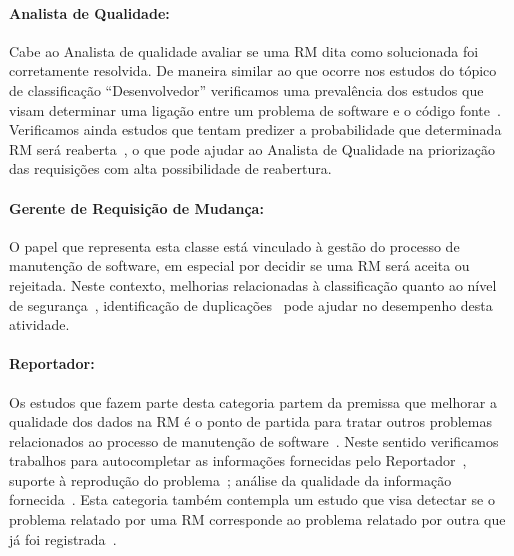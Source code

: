\paragraph{Analista de Qualidade:} Cabe ao Analista de qualidade avaliar se uma
RM dita como solucionada foi corretamente resolvida. De maneira similar ao que
ocorre nos estudos do tópico de classificação ``Desenvolvedor'' verificamos uma
prevalência dos estudos que visam determinar uma ligação entre um problema de
software e o código
fonte~\cite{corley2011recovering,Wong:2014:BBF:2705615.2706096,
	Thung:2014:BIT:2635868.2661678,Nguyen:2012:MAR:2393596.2393671,thung2013automatic,
	Romo:2015:TAT:2745802.2745833}. Verificamos ainda estudos que tentam
predizer a probabilidade que determinada RM será
reaberta~\cite{xia2015automatic}, o que pode ajudar ao Analista de Qualidade na
priorização das requisições com alta possibilidade de reabertura.

\paragraph{Gerente de Requisição de	Mudança:} O papel que representa esta classe
está vinculado à gestão do processo de manutenção de software, em especial por
decidir se uma RM será aceita ou rejeitada. Neste contexto, melhorias
relacionadas à classificação quanto ao nível de
segurança~\cite{gegick2010identifying, zhang2011bug,
	ValdiviaGarcia:2014:CPB:2597073.2597099}, identificação de
duplicações~\cite{hindle2016contextual, sun2010discriminative,
	alipour2013contextual, banerjee2012automated} pode ajudar no desempenho
desta atividade.

\paragraph{Reportador:} Os estudos que fazem parte desta categoria  partem da
premissa que melhorar a qualidade dos dados na RM é o ponto de partida para
tratar outros problemas relacionados ao processo de manutenção de
software~\cite{moran2015auto, Moran:2015:EAA:2786805.2807557, Bettenburg2008a}.
Neste sentido verificamos trabalhos para autocompletar as informações fornecidas
pelo Reportador~\cite{moran2015auto}, suporte à reprodução do
problema~\cite{Moran:2015:EAA:2786805.2807557}; análise da qualidade da
informação fornecida~\cite{Bettenburg2008a, Tu:2014:MQI:2677832.2677844}. Esta
categoria também contempla um estudo que visa detectar se o problema relatado
por uma RM corresponde ao problema relatado por outra que já foi
registrada~\cite{Thung2014}.

